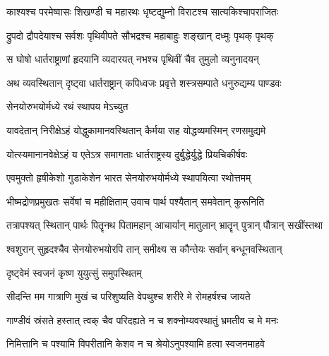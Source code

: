 \twolineshloka
{काश्यश्च परमेष्वासः शिखण्डी च महारथः}
{धृष्टद्युम्नो विराटश्च सात्यकिश्चापराजितः}%

\twolineshloka
{द्रुपदो द्रौपदेयाश्च सर्वशः पृथिवीपते}
{सौभद्रश्च महाबाहुः शङ्खान् दध्मुः पृथक् पृथक्}%

\twolineshloka
{स घोषो धार्तराष्ट्राणां हृदयानि व्यदारयत्}
{नभश्च पृथिवीं चैव तुमुलो व्यनुनादयन्}%

\twolineshloka
{अथ व्यवस्थितान् दृष्ट्वा धार्तराष्ट्रान् कपिध्वजः}
{प्रवृत्ते शस्त्रसम्पाते धनुरुद्यम्य पाण्डवः}%



\onelineshloka
{सेनयोरुभयोर्मध्ये रथं स्थापय मेऽच्युत}%

\twolineshloka
{यावदेतान् निरीक्षेऽहं योद्धुकामानवस्थितान्}
{कैर्मया सह योद्धव्यमस्मिन् रणसमुद्यमे}%

\twolineshloka
{योत्स्यमानानवेक्षेऽहं य एतेऽत्र समागताः}
{धार्तराष्ट्रस्य दुर्बुद्धेर्युद्धे प्रियचिकीर्षवः}%


\twolineshloka
{एवमुक्तो हृषीकेशो गुडाकेशेन भारत}
{सेनयोरुभयोर्मध्ये स्थापयित्वा रथोत्तमम्}%

\twolineshloka
{भीष्मद्रोणप्रमुखतः सर्वेषां च महीक्षिताम्}
{उवाच पार्थ पश्यैतान् समवेतान् कुरूनिति}%

\twolineshloka
{तत्रापश्यत् स्थितान् पार्थः पितॄनथ पितामहान्}
{आचार्यान् मातुलान् भ्रातॄन् पुत्रान् पौत्रान् सखींस्तथा}%

\twolineshloka
{श्वशुरान् सुहृदश्चैव सेनयोरुभयोरपि}
{तान् समीक्ष्य स कौन्तेयः सर्वान् बन्धूनवस्थितान्}%



\onelineshloka
{दृष्ट्वेमं स्वजनं कृष्ण युयुत्सुं समुपस्थितम्}%

\twolineshloka
{सीदन्ति मम गात्राणि मुखं च परिशुष्यति}
{वेपथुश्च शरीरे मे रोमहर्षश्च जायते}%

\twolineshloka
{गाण्डीवं स्रंसते हस्तात् त्वक् चैव परिदह्यते}
{न च शक्नोम्यवस्थातुं भ्रमतीव च मे मनः}%

\twolineshloka
{निमित्तानि च पश्यामि विपरीतानि केशव}
{न च श्रेयोऽनुपश्यामि हत्वा स्वजनमाहवे}%

